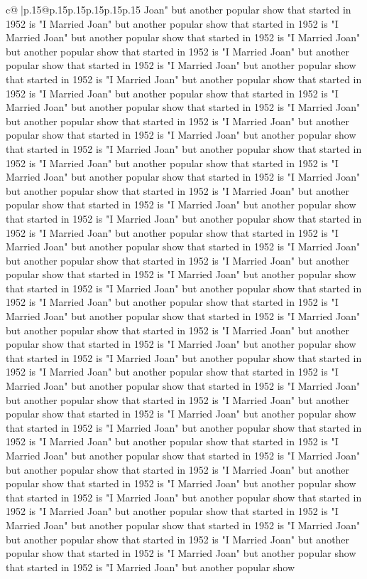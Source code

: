\documentclass{article}
\begin{document}
{\begin{supertabular}{c@{$\;$}|p{.15\linewidth}@{}p{.15\linewidth}p{.15\linewidth}p{.15\linewidth}p{.15\linewidth}p{.15\linewidth}}
{{{Joan" but another popular show that started in 1952 is "I Married Joan" but another popular show that started in 1952 is "I Married Joan" but another popular show that started in 1952 is "I Married Joan" but another popular show that started in 1952 is "I Married Joan" but another popular show that started in 1952 is "I Married Joan" but another popular show that started in 1952 is "I Married Joan" but another popular show that started in 1952 is "I Married Joan" but another popular show that started in 1952 is "I Married Joan" but another popular show that started in 1952 is "I Married Joan" but another popular show that started in 1952 is "I Married Joan" but another popular show that started in 1952 is "I Married Joan" but another popular show that started in 1952 is "I Married Joan" but another popular show that started in 1952 is "I Married Joan" but another popular show that started in 1952 is "I Married Joan" but another popular show that started in 1952 is "I Married Joan" but another popular show that started in 1952 is "I Married Joan" but another popular show that started in 1952 is "I Married Joan" but another popular show that started in 1952 is "I Married Joan" but another popular show that started in 1952 is "I Married Joan" but another popular show that started in 1952 is "I Married Joan" but another popular show that started in 1952 is "I Married Joan" but another popular show that started in 1952 is "I Married Joan" but another popular show that started in 1952 is "I Married Joan" but another popular show that started in 1952 is "I Married Joan" but another popular show that started in 1952 is "I Married Joan" but another popular show that started in 1952 is "I Married Joan" but another popular show that started in 1952 is "I Married Joan" but another popular show that started in 1952 is "I Married Joan" but another popular show that started in 1952 is "I Married Joan" but another popular show that started in 1952 is "I Married Joan" but another popular show that started in 1952 is "I Married Joan" but another popular show that started in 1952 is "I Married Joan" but another popular show that started in 1952 is "I Married Joan" but another popular show that started in 1952 is "I Married Joan" but another popular show that started in 1952 is "I Married Joan" but another popular show that started in 1952 is "I Married Joan" but another popular show that started in 1952 is "I Married Joan" but another popular show that started in 1952 is "I Married Joan" but another popular show that started in 1952 is "I Married Joan" but another popular show that started in 1952 is "I Married Joan" but another popular show that started in 1952 is "I Married Joan" but another popular show that started in 1952 is "I Married Joan" but another popular show that started in 1952 is "I Married Joan" but another popular show that started in 1952 is "I Married Joan" but another popular show that started in 1952 is "I Married Joan" but another popular show that started in 1952 is "I Married Joan" but another popular show that started in 1952 is "I Married Joan" but another popular show that started in 1952 is "I Married Joan" but another popular show }}}
\end{supertabular}}
\end{document}
